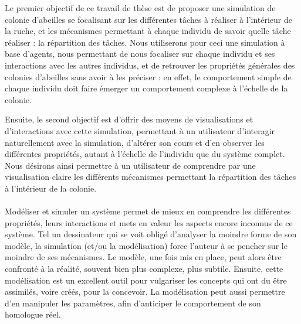 	Le premier objectif de ce travail de thèse est de proposer une simulation de colonie d'abeilles se focalisant sur les différentes tâches à réaliser à l'intérieur de la ruche, et les mécanismes permettant à chaque individu de savoir quelle tâche réaliser : la répartition des tâches. Nous utiliserons pour ceci une simulation à base d'agents, nous permettant de nous focaliser sur chaque individu et ses interactions avec les autres individus, et de retrouver les propriétés générales des colonies d'abeilles sans avoir à les préciser : en effet, le comportement simple de chaque individu doit faire émerger un comportement complexe à l'échelle de la colonie. 
	
	Ensuite, le second objectif est d'offrir des moyens de visualisations et d'interactions avec cette simulation, permettant à un utilisateur d'interagir naturellement avec la simulation, d'altérer son cours et d'en observer les différentes propriétés, autant à l'échelle de l'individu que du système complet. Nous désirons ainsi permettre à un utilisateur de comprendre par une visualisation claire les différents mécanismes permettant la répartition des tâches à l'intérieur de la colonie.
	
	\paragraph{}		
		Modéliser et simuler un système permet de mieux en comprendre les différentes propriétés, leurs interactions et mets en valeur les aspects encore inconnus de ce système. Tel un dessinateur qui se voit obligé d'analyser la moindre forme de son modèle, la simulation (et/ou la modélisation) force l'auteur à se pencher sur le moindre de ses mécanismes. Le modèle, une fois mis en place, peut alors être confronté à la réalité, souvent bien plus complexe, plus subtile. Ensuite, cette modélisation est un excellent outil pour vulgariser les concepts qui ont du être assimilés, voire créés, pour la concevoir. La modélisation peut aussi permettre d'en manipuler les paramètres, afin d'anticiper le comportement de son homologue réel.
		
	
